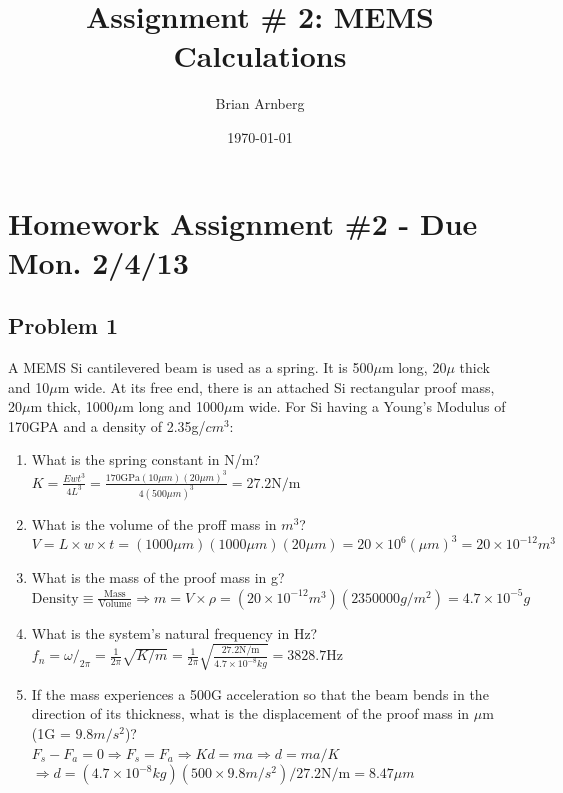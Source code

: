 \documentclass{article}
\title{Assignment \# 2: MEMS Calculations}
\date{\today}
\author{Brian Arnberg}
\begin{document}
\label{start}



\section*{ Homework Assignment \#2 - Due Mon. 2/4/13 }
\subsection*{ Problem 1 }
A MEMS Si cantilevered beam is used as a spring. It is 500$\mu$m long, 20$\mu$ thick
   and 10$\mu$m wide. At its free end, there is an attached Si rectangular proof mass,
   20$\mu$m thick, 1000$\mu$m long and 1000$\mu$m wide. For Si having a Young's Modulus
   of 170GPA and a density of 2.35g/$cm^3$:

\renewcommand{\labelenumi}{\alph{enumi}.}
\begin{enumerate}
	\item What is the spring constant in N/m?\\
	$ K = \frac{E w t^3}{4 L^3} = 
		\frac{170 \text{GPa} (10\mu m) (20\mu m)^3}{4(500\mu m)^3} = 
		27.2 \text{N/m} $ 
	\item What is the volume of the proff mass in $m^3$?\\
		$ V = L \times w \times t =
		(1000\mu m)(1000\mu m)(20\mu m) =
		20 \times 10^6 (\mu m)^3 =
		20 \times 10^{-12} m^3 $
	\item What is the mass of the proof mass in g?\\
		$ \text{Density} \equiv \frac{\text{Mass}}{\text{Volume}} 
		\Rightarrow m = V \times \rho = (20 \times 10^{-12} m^3)(2350000 g/m^2)
		= 4.7 \times 10^{-5} g$
	\item What is the system's natural frequency in Hz?\\
		$ f_n = \omega/_{2\pi} = \frac{1}{2\pi}\sqrt{K/m} 
		= \frac{1}{2\pi}\sqrt{\frac{27.2 \text{N/m}}{4.7 \times 10^{-8} kg}}
		= 3828.7 \text{Hz} $
	\item If the mass experiences a 500G acceleration so that the beam bends in the
       direction of its thickness, what is the displacement of the proof mass in $\mu$m
       (1G = $9.8m/s^2$)?\\
       		$ F_s - F_a = 0 \Rightarrow F_s = F_a \Rightarrow K d = m a \Rightarrow d = m a / K$\\$
		\Rightarrow d = (4.7\times10^{-8} kg )(500 \times 9.8 m/s^2)/ 27.2 \text{N/m}
		= 8.47 \mu m$
\end{enumerate}
\end{document}

